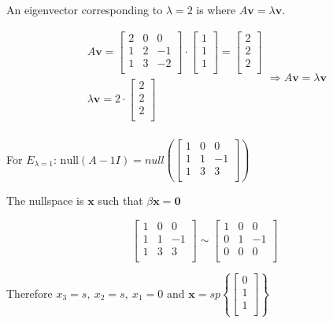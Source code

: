 \documentclass[12pt]{article}
\theoremstyle{plain}
\theoremstyle{remark}
\theoremstyle{definition}
\begin{document}
An eigenvector corresponding to \(\lambda = 2\) is where
\(A\mathbf{v} = \lambda\mathbf{v}\).

\[\begin{matrix}
A\mathbf{v} = \begin{bmatrix}
2 & 0 & 0 \\
1 & 2 & - 1 \\
1 & 3 & - 2 \\
\end{bmatrix} \cdot \begin{bmatrix}
1 \\
1 \\
1 \\
\end{bmatrix} = \begin{bmatrix}
2 \\
2 \\
2 \\
\end{bmatrix} \\
\lambda\mathbf{v} = 2 \cdot \begin{bmatrix}
2 \\
2 \\
2 \\
\end{bmatrix} \\
\end{matrix} \Rightarrow A\mathbf{v} = \lambda\mathbf{v}\]

For \(E_{\lambda = 1}\):
\(\text{null}(A - 1I) = null\left( \begin{bmatrix}
1 & 0 & 0 \\
1 & 1 & - 1 \\
1 & 3 & 3 \\
\end{bmatrix} \right)\)

The nullspace is \(\mathbf{x}\) such that
\(\beta\mathbf{x} = \mathbf{0}\)

\[\begin{bmatrix}
1 & 0 & 0 \\
1 & 1 & - 1 \\
1 & 3 & 3 \\
\end{bmatrix}\sim\begin{bmatrix}
1 & 0 & 0 \\
0 & 1 & - 1 \\
0 & 0 & 0 \\
\end{bmatrix}\]

Therefore \(x_{3} = s,\ x_{2} = s,\ x_{1} = 0\) and
\(\mathbf{x} = sp\left\{ \begin{bmatrix}
0 \\
1 \\
1 \\
\end{bmatrix} \right\}\)
\end{document}

